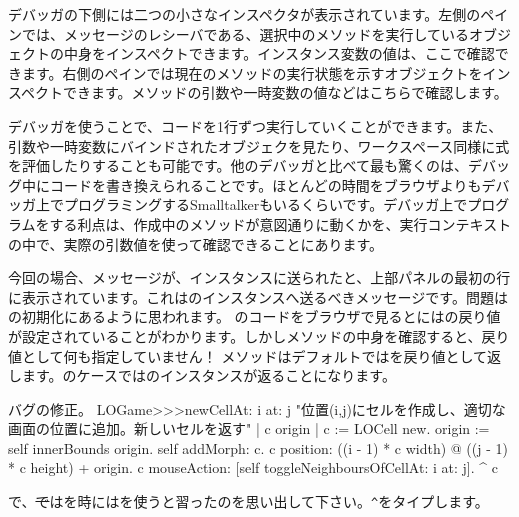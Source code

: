 \documentclass[a4paper,10pt,twoside]{book}
\begin{document}
デバッガの下側には二つの小さなインスペクタが表示されています。左側のペインでは、メッセージのレシーバである、選択中のメソッドを実行しているオブジェクトの中身をインスペクトできます。インスタンス変数の値は、ここで確認できます。右側のペインでは現在のメソッドの実行状態を示すオブジェクトをインスペクトできます。メソッドの引数や一時変数の値などはこちらで確認します。

デバッガを使うことで、コードを1行ずつ実行していくことができます。また、引数や一時変数にバインドされたオブジェクを見たり、ワークスペース同様に式を評価したりすることも可能です。他のデバッガと比べて最も驚くのは、デバッグ中にコードを書き換えられることです。ほとんどの時間をブラウザよりもデバッガ上でプログラミングするSmalltalkerもいるくらいです。デバッガ上でプログラムをする利点は、作成中のメソッドが意図通りに動くかを、実行コンテキストの中で、実際の引数値を使って確認できることにあります。

今回の場合、メッセージが、インスタンスに送られたと、上部パネルの最初の行に表示されています。これはのインスタンスへ送るべきメッセージです。問題はの初期化にあるように思われます。
のコードをブラウザで見るとにはの戻り値が設定されていることがわかります。しかしメソッドの中身を確認すると、戻り値として何も指定していません！ メソッドはデフォルトではを戻り値として返します。のケースではのインスタンスが返ることになります。

\dothis{デバッガウインドウを閉じてください。
その後で、``\ct{^ c}''と \ct{LOGame>>>newCellAt:at:}メソッドの最後に追加して、\ct{c}を返すようにします。
(\mthref{newCellAt:at:nobug}参照。)}

\begin{method}{バグの修正。}
LOGame>>>newCellAt: i at: j
   "位置(i,j)にセルを作成し、適切な画面の位置に追加。新しいセルを返す"
   | c origin |
   c := LOCell new.
   origin := self innerBounds origin.
   self addMorph: c.
   c position: ((i - 1) * c width) @ ((j - 1) * c height) + origin.
   c mouseAction: [self toggleNeighboursOfCellAt: i at: j].
   ^ c
\end{method}

\noindent
{}で、\st ではを時には\ct{^}を使うと習ったのを思い出して下さい。\verb|^|をタイプします。
\end{document}
